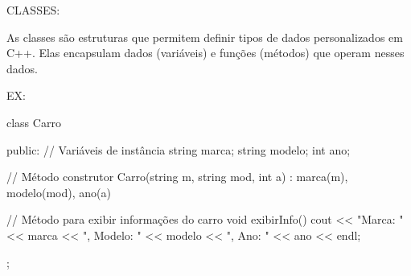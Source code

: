 CLASSES:

As classes são estruturas que permitem definir tipos de dados personalizados em C++.
Elas encapsulam dados (variáveis) e funções (métodos) que operam nesses dados.

EX:

class Carro {
public:
    // Variáveis de instância
    string marca;
    string modelo;
    int ano;
    
    // Método construtor
    Carro(string m, string mod, int a) : marca(m), modelo(mod), ano(a) {}

    // Método para exibir informações do carro
    void exibirInfo() {
        cout << "Marca: " << marca << ", Modelo: " << modelo << ", Ano: " << ano << endl;
    }
};